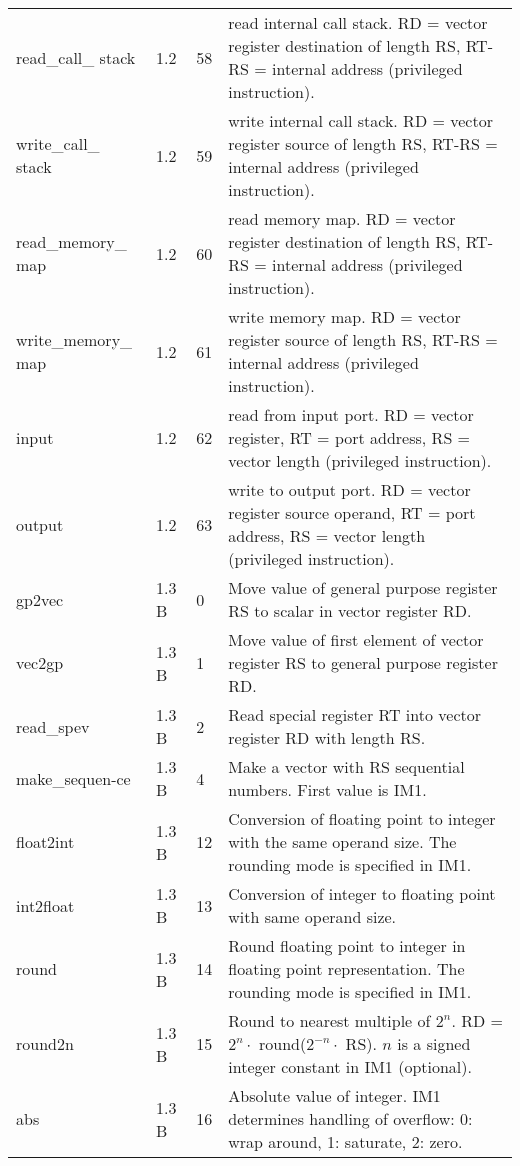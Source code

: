 \documentclass[forwardcom.tex]{subfiles}
\begin{document}
\begin{longtable} {|p{20mm}|p{10mm}|p{8mm}|p{75mm}|}
read\_call\_ stack & 1.2 & 58 & read internal call stack. RD = vector register destination of length RS, RT-RS = internal address (privileged instruction). \\
write\_call\_ stack & 1.2 & 59 & write internal call stack. RD = vector register source of length RS, RT-RS = internal address (privileged instruction). \\

read\_memory\_ map & 1.2 & 60 & read memory map. RD = vector register destination of length RS, RT-RS = internal address (privileged instruction). \\
write\_memory\_ map & 1.2 & 61 & write memory map. RD = vector register source of length RS, RT-RS = internal address (privileged instruction). \\

input         & 1.2 & 62 & read from input port. RD = vector register, RT = port address, RS = vector length (privileged instruction). \\
output        & 1.2 & 63 & write to output port. RD = vector register source operand, RT = port address, RS = vector length (privileged instruction). \\

gp2vec        & 1.3 B &  0 & Move value of general purpose register RS to scalar in vector register RD. \\

vec2gp        & 1.3 B &  1 & Move value of first element of vector register RS to general purpose register RD. \\

read\_spev    & 1.3 B &  2 & Read special register RT into vector register RD with  length RS. \\
make\_sequen-ce& 1.3 B &  4 & Make a vector with RS sequential numbers. First value is IM1. \\

float2int     & 1.3 B & 12 & Conversion of floating point to integer with the same operand size. The rounding mode is specified in IM1. \\
int2float     & 1.3 B & 13 & Conversion of integer to floating point with same operand size. \\

round         & 1.3 B & 14 & Round floating point to integer in floating point  representation. The rounding mode is specified in IM1. \\
round2n       & 1.3 B & 15 & Round to nearest multiple of $2^n$. \newline 
RD = $2^n\cdot$ round($2^{-n}\cdot$ RS). $n$ is a signed integer constant in IM1 (optional). \\
abs           & 1.3 B & 16 & Absolute value of integer. IM1 determines handling of overflow: 0: wrap around, 1: saturate, 2: zero. \\


\end{longtable}
\end{document}
